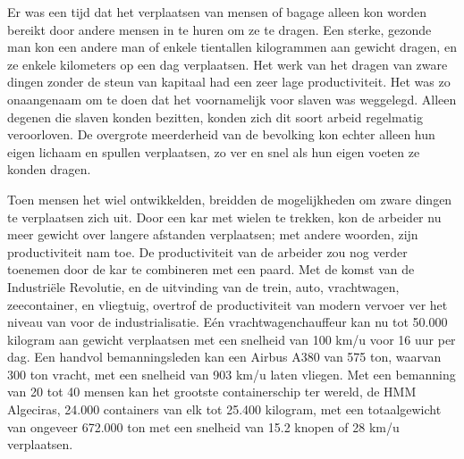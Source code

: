Er was een tijd dat het verplaatsen van mensen of bagage alleen kon worden bereikt door andere mensen in te huren om ze te dragen. Een sterke, gezonde man kon een andere man of enkele tientallen kilogrammen aan gewicht dragen, en ze enkele kilometers op een dag verplaatsen. Het werk van het dragen van zware dingen zonder de steun van kapitaal had een zeer lage productiviteit. Het was zo onaangenaam om te doen dat het voornamelijk voor slaven was weggelegd. Alleen degenen die slaven konden bezitten, konden zich dit soort arbeid regelmatig veroorloven. De overgrote meerderheid van de bevolking kon echter alleen hun eigen lichaam en spullen verplaatsen, zo ver en snel als hun eigen voeten ze konden dragen.

Toen mensen het wiel ontwikkelden, breidden de mogelijkheden om zware dingen te verplaatsen zich uit. Door een kar met wielen te trekken, kon de arbeider nu meer gewicht over langere afstanden verplaatsen; met andere woorden, zijn productiviteit nam toe. De productiviteit van de arbeider zou nog verder toenemen door de kar te combineren met een paard. Met de komst van de Industriële Revolutie, en de uitvinding van de trein, auto, vrachtwagen, zeecontainer, en vliegtuig, overtrof de productiviteit van modern vervoer ver het niveau van voor de industrialisatie. Eén vrachtwagenchauffeur kan nu tot 50.000 kilogram aan gewicht verplaatsen met een snelheid van 100 km/u voor 16 uur per dag. Een handvol bemanningsleden kan een Airbus A380 van 575 ton, waarvan 300 ton vracht, met een snelheid van 903 km/u laten vliegen. Met een bemanning van 20 tot 40 mensen kan het grootste containerschip ter wereld, de HMM Algeciras, 24.000 containers van elk tot 25.400 kilogram, met een totaalgewicht van ongeveer 672.000 ton met een snelheid van 15.2 knopen of 28 km/u verplaatsen.

